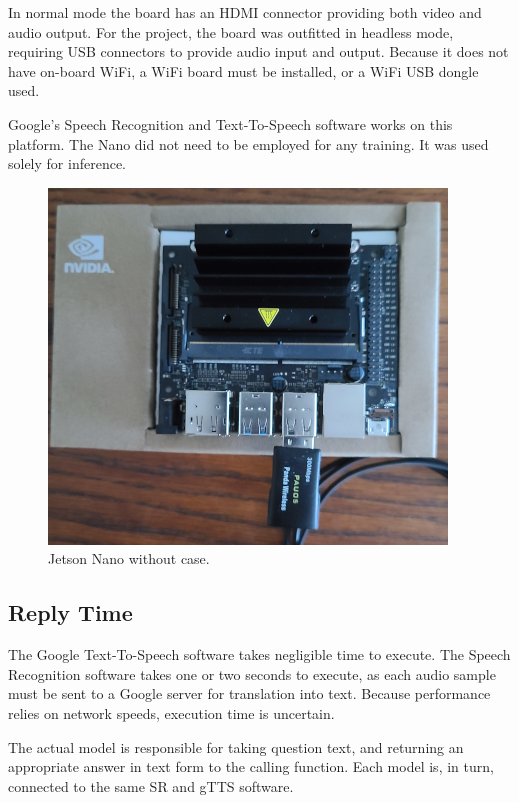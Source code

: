 In normal mode the board has an HDMI connector providing both video and audio output. For the project, the board was outfitted in headless mode, %
requiring USB connectors to provide audio input and output. Because it does not have on-board WiFi, a WiFi board must be installed, or a WiFi USB dongle used.

Google's Speech Recognition and Text-To-Speech software works on this platform. The Nano did not need to be employed for any training. It was used solely for inference.

\begin{figure}[H]
	\begin{center}
		\includegraphics[scale=0.9]{diagram-jetson-nano-02}
		
		
	\end{center}
	\caption[Jetson Nano]{Jetson Nano without case.}
	
	
\end{figure}

\subsection{Reply Time}

The Google Text-To-Speech software takes negligible time to execute. The Speech Recognition software takes one or two seconds to execute, as each audio sample must be sent to a Google server for translation into text. Because performance relies on network speeds, execution time is uncertain.

The actual model is responsible for taking question text, and returning an appropriate answer in text form to the calling function. Each model is, in turn, connected to the same SR and gTTS software.

